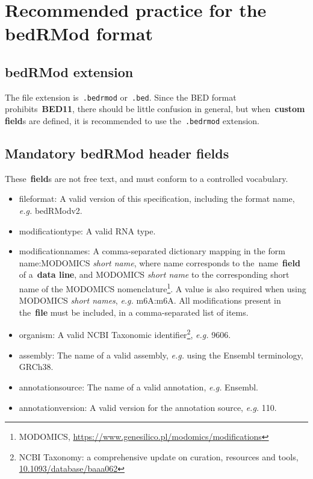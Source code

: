 \documentclass[11pt]{article}
\begin{document}
\section{Recommended practice for the \acs{bedRMod} format}

\subsection{\acs{bedRMod} extension}
The file extension is~\texttt{.bedrmod} or~\texttt{.bed}. Since the \ac{BED} format prohibits~\textbf{BED11}, there should be little confusion in general, but when~\textbf{custom field}s are defined, it is recommended to use the~\texttt{.bedrmod} extension.

\subsection{Mandatory \acs{bedRMod} header fields}
These~\textbf{field}s are not free text, and must conform to a controlled vocabulary.
\begin{itemize}
\item \textsf{fileformat}: A valid version of this specification, including the format name, \textit{e.g.} bedRModv2. 

\item \textsf{modification\textunderscore type}: A valid RNA type. 

\item \textsf{modification\textunderscore names}: A comma-separated dictionary mapping in the form name:MODOMICS \emph{short name}, where name corresponds to the~\textsf{name}~\textbf{field} of a~\textbf{data line}, and MODOMICS \emph{short name} to the corresponding short name of the MODOMICS nomenclature\footnote{MODOMICS, \url{https://www.genesilico.pl/modomics/modifications}}. A value is also required when using MODOMICS \emph{short names}, \textit{e.g.} m6A:m6A. All modifications present in the~\textbf{file} must be included, in a comma-separated list of items.

\item \textsf{organism}: A valid NCBI Taxonomic identifier\footnote{NCBI Taxonomy: a comprehensive update on curation, resources and tools, \url{10.1093/database/baaa062}}, \textit{e.g.} 9606.

\item \textsf{assembly}: The name of a valid assembly, \textit{e.g.} using the Ensembl terminology, GRCh38. 

\item \textsf{annotation\textunderscore source}: The name of a valid annotation, \textit{e.g.} Ensembl. 

\item \textsf{annotation\textunderscore version}: A valid version for the annotation source, \textit{e.g.} 110. 
\end{itemize}
\end{document}
